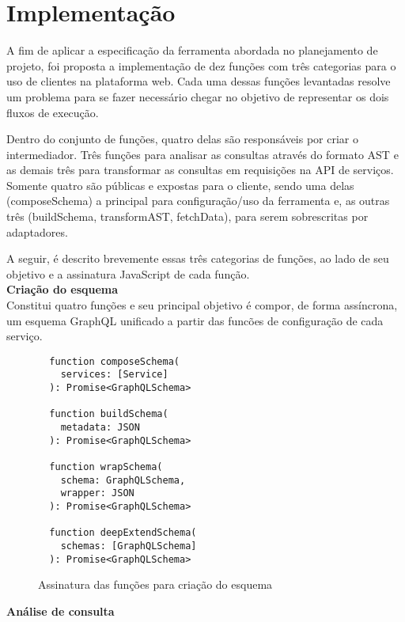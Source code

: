 \section{Implementação}

A fim de aplicar a especificação da ferramenta abordada no planejamento de projeto, foi proposta a implementação de dez funções com três categorias para o uso de clientes na plataforma web. Cada uma dessas funções levantadas resolve um problema para se fazer necessário chegar no objetivo de representar os dois fluxos de execução.

Dentro do conjunto de funções, quatro delas são responsáveis por criar o intermediador. Três funções para analisar as consultas através do formato AST e as demais três para transformar as consultas em requisições na API de serviços. Somente quatro são públicas e expostas para o cliente, sendo uma delas (composeSchema) a principal para configuração/uso da ferramenta e, as outras três (buildSchema, transformAST, fetchData), para serem sobrescritas por adaptadores. 

A seguir, é descrito brevemente essas três categorias de funções, ao lado de seu objetivo e a assinatura JavaScript de cada função. \\

\textbf{Criação do esquema} \\

Constitui quatro funções e seu principal objetivo é compor, de forma assíncrona, um esquema GraphQL unificado a partir das funcões de configuração de cada serviço.

\begin{figure}[H]
  \centering
  \begin{verbatim}
  function composeSchema(
    services: [Service]
  ): Promise<GraphQLSchema>

  function buildSchema(
    metadata: JSON
  ): Promise<GraphQLSchema>

  function wrapSchema(
    schema: GraphQLSchema,
    wrapper: JSON
  ): Promise<GraphQLSchema>

  function deepExtendSchema(
    schemas: [GraphQLSchema]
  ): Promise<GraphQLSchema>
  \end{verbatim}
  \caption{Assinatura das funções para criação do esquema}
\end{figure}

\textbf{Análise de consulta} \\

